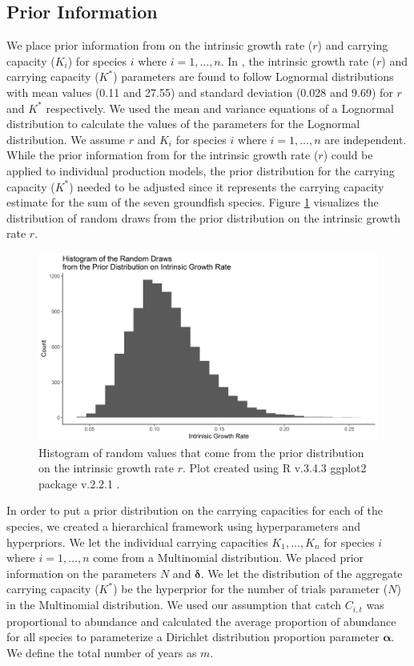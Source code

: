 \documentclass[oneside,12pt,final]{sty/ucthesis-CA2012}
\let\cite\citep                             %
\begin{document}
\begin{mainmatter}
\subsection*{Prior Information}
We place prior information from \citet{langseth2018stock} on the intrinsic growth rate ($r$) and carrying capacity ($K_i$) for species $i$ where $i=1,\dots,n$. In \citet{langseth2018stock}, the intrinsic growth rate ($r$) and carrying capacity ($K^*$) parameters are found to follow Lognormal distributions with mean values (0.11 and 27.55) and standard deviation (0.028 and 9.69) for $r$ and $K^*$ respectively.
We used the mean and variance equations of a Lognormal distribution to calculate the  values of the parameters for the Lognormal distribution. We assume $r$ and $K_i$ for species $i$ where $i=1,\dots,n$ are independent. While the prior information from \citet{langseth2018stock} for the intrinsic growth rate ($r$) could be applied to individual production models, the prior distribution for the carrying capacity ($K^*$) needed to be adjusted since it represents the carrying capacity estimate for the sum of the seven groundfish species. Figure \ref{priorr} visualizes the distribution of random draws from the prior distribution on the intrinsic growth rate $r$.

\begin{figure}[H]
     \centering
       \includegraphics[width=.9\textwidth]{fig/hist_prior_r}
    \caption{Histogram of random values that come from the prior distribution on the intrinsic growth rate $r$. Plot created using R v.3.4.3 \cite{Rcite} ggplot2 package v.2.2.1 \cite{ggplot}. }
    \label{priorr}
\end{figure}

In order to put a prior distribution on the carrying capacities for each of the species, we created a hierarchical framework using hyperparameters and hyperpriors. We let the individual carrying capacities $K_1,...,K_n$ for species $i$ where $i=1,\dots,n$ come from a Multinomial distribution. We placed prior information on the parameters $N$ and $\boldsymbol{\delta}$. We let the distribution of the aggregate carrying capacity ($K^*$) be the hyperprior for the number of trials parameter ($N$) in the Multinomial distribution. We used our assumption that catch $C_{i,t}$ was proportional to abundance and calculated the average proportion of abundance for all  species to parameterize a Dirichlet distribution proportion parameter $\boldsymbol{\alpha}$. We define the total number of years as $m$.


\end{mainmatter}
\end{document}
